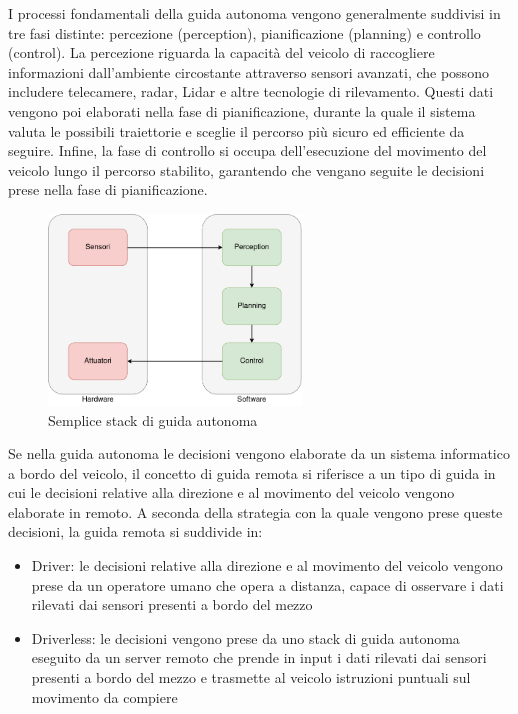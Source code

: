 \noindent I processi fondamentali della guida autonoma vengono generalmente suddivisi in tre fasi distinte: percezione (perception), pianificazione (planning) e controllo (control).
La percezione riguarda la capacità del veicolo di raccogliere informazioni dall'ambiente circostante attraverso sensori avanzati, che possono includere telecamere, radar, Lidar e altre tecnologie di rilevamento. Questi dati vengono poi elaborati nella fase di pianificazione, durante la quale il sistema valuta le possibili traiettorie e sceglie il percorso più sicuro ed efficiente da seguire. Infine, la fase di controllo si occupa dell'esecuzione del movimento del veicolo lungo il percorso stabilito, garantendo che vengano seguite le decisioni prese nella fase di pianificazione.

\begin{figure}[H]
  \centering
  \includegraphics[width=0.6\textwidth]{figures/guida_autonoma.png}
  \caption{Semplice stack di guida autonoma}
  \label{guida_autonoma}
\end{figure}

\noindent Se nella guida autonoma le decisioni vengono elaborate da un sistema informatico a bordo del veicolo, il concetto di guida remota si riferisce a un tipo di guida in cui le decisioni relative alla direzione e al movimento del veicolo vengono elaborate in remoto. A seconda della strategia con la quale vengono prese queste decisioni, la guida remota si suddivide in:

\begin{itemize}
    \item Driver: le decisioni relative alla direzione e al movimento del veicolo vengono prese da un operatore umano che opera a distanza, capace di osservare i dati rilevati dai sensori presenti a bordo del mezzo
    \item Driverless: le decisioni vengono prese da uno stack di guida autonoma eseguito da un server remoto che prende in input i dati rilevati dai sensori presenti a bordo del mezzo e trasmette al veicolo istruzioni puntuali sul movimento da compiere 
\end{itemize}


